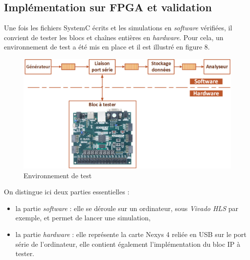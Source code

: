 \documentclass[a4paper,12pt]{article}
\begin{document}
\subsection{Implémentation sur FPGA et validation}
Une fois les fichiers SystemC écrits et les simulations en \textit{software} vérifiées, il convient de tester les blocs et chaînes entières en \textit{hardware}. Pour cela, un environnement de test a été mis en place et il est illustré en figure 8.
\begin{figure}[H]
\centering
\includegraphics[width=\textwidth, keepaspectratio]{Dessin6.png}
\caption{Environnement de test}
\end{figure}
\noindent On distingue ici deux parties essentielles :\\
\begin{itemize}
\item[\textbullet] la partie \textit{software} : elle se déroule sur un ordinateur, sous \textit{Vivado HLS} par exemple, et permet de lancer une simulation,\\
\item[\textbullet] la partie \textit{hardware} : elle représente la carte Nexys 4 reliée en USB sur le port série de l'ordinateur, elle contient également l'implémentation du bloc IP à tester.\\
\end{itemize} 
\end{document}
